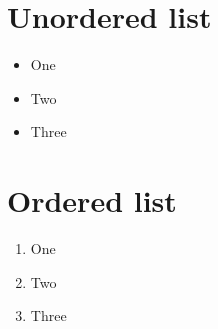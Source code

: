 \documentclass{article}
\begin{document}
\section{Unordered list}
\begin{itemize}
	\item One
	\item Two
	\item Three
\end{itemize}

\section{Ordered list}
\begin{enumerate}
    \item One
    \item Two
    \item Three
\end{enumerate}
\end{document}
